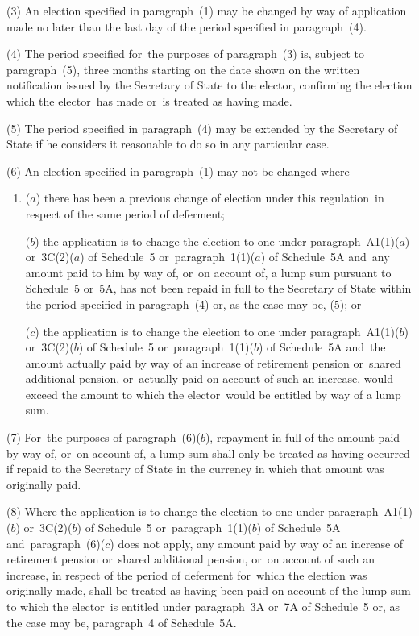 \documentclass[12pt,a4paper]{article}
\begin{document}
(3) An election specified in paragraph~(1) may be changed by way of application made no later than the last day of the period specified in paragraph~(4).

(4) The period specified for~the purposes of paragraph~(3) is, subject to paragraph~(5), three months starting on the date shown on the written notification issued by the Secretary of State to the elector, confirming the election which the elector~has made or~is treated as having made.

(5) The period specified in paragraph~(4) may be extended by the Secretary of State if he considers it reasonable to do so in any particular case.

(6) An election specified in paragraph~(1) may not be changed where—
\begin{enumerate}\item[]
($a$) there has been a previous change of election under this regulation~in respect of the same period of deferment;

\begin{sloppypar}
($b$) the application is to change the election to one under paragraph~A1(1)($a$)  or~3C(2)($a$)  of Schedule~5 or~paragraph~1(1)($a$)  of Schedule~5A and~any amount paid to him by way of, or~on account of, a lump sum pursuant to Schedule~5 or~5A, has not been repaid in full to the Secretary of State within the period specified in paragraph~(4) or, as the case may be, (5); or
\end{sloppypar}

\begin{sloppypar}
($c$) the application is to change the election to one under paragraph~A1(1)($b$)  or~3C(2)($b$)  of Schedule~5 or~paragraph~1(1)($b$)  of Schedule~5A and~the amount actually paid by way of an increase of retirement pension or~shared additional pension, or~actually paid on account of such an increase, would exceed the amount to which the elector~would be entitled by way of a lump sum.
\end{sloppypar}
\end{enumerate}

(7) For~the purposes of paragraph~(6)($b$), repayment in full of the amount paid by way of, or~on account of, a lump sum shall only be treated as having occurred if repaid to the Secretary of State in the currency in which that amount was originally paid.

(8) Where the application is to change the election to one under paragraph~A1(1)($b$)  or~3C(2)($b$)  of Schedule~5 or~paragraph~1(1)($b$)  of Schedule~5A and~paragraph~(6)($c$)  does not apply, any amount paid by way of an increase of retirement pension or~shared additional pension, or~on account of such an increase, in respect of the period of deferment for~which the election was originally made, shall be treated as having been paid on account of the lump sum to which the elector~is entitled under paragraph~3A or~7A of Schedule~5 or, as the case may be, paragraph~4 of Schedule~5A.
\end{document}

